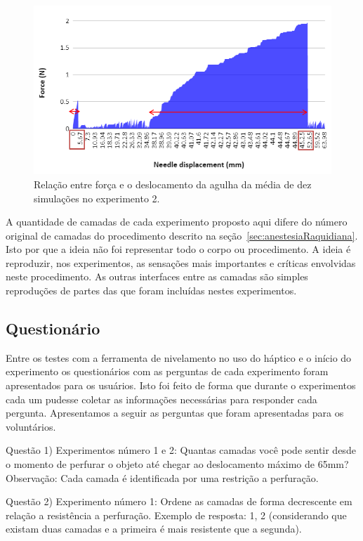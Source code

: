 \begin{figure}[ht!]
    \centering
    \includegraphics[width=0.8\linewidth]{capitulos/figuras/Experiment 2 - Force x Needle displacement - marked.PNG} 
    \caption{Relação entre força e o deslocamento da agulha da média de dez simulações no experimento 2.}
    \label{fig:forcaDeslocamentoExperimento2}
\end{figure}

A quantidade de camadas de cada experimento proposto aqui difere do número original de camadas do procedimento descrito na seção~\ref{sec:anestesiaRaquidiana}. Isto por que a ideia não foi representar todo o corpo ou procedimento. A ideia é reproduzir, nos experimentos, as sensações mais importantes e críticas envolvidas neste procedimento. As outras interfaces entre as camadas são simples reproduções de partes das que foram incluídas nestes experimentos.

\subsection{Questionário}
\label{sec:questionario}

Entre os testes com a ferramenta de nivelamento no uso do háptico e o início do experimento os questionários com as perguntas de cada experimento foram apresentados para os usuários. Isto foi feito de forma que durante o experimentos cada um pudesse coletar as informações necessárias para responder cada pergunta. Apresentamos a seguir as perguntas que foram apresentadas para os voluntários.

Questão 1) Experimentos número 1 e 2: Quantas camadas você pode sentir desde o momento de perfurar o objeto até chegar ao deslocamento máximo de 65mm? 
Observação: Cada camada é identificada por uma restrição a perfuração.

Questão 2) Experimento número 1: Ordene as camadas de forma decrescente em relação a resistência a perfuração.    
Exemplo de resposta: 1, 2 (considerando que existam duas camadas e a primeira é mais resistente que a segunda).

